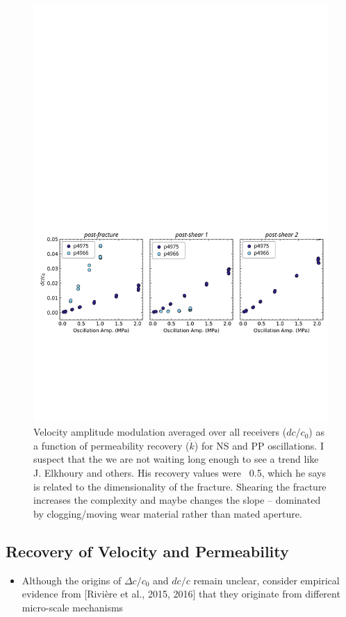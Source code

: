\documentclass[letterpaper,10pt]{article}
\begin{document}
\begin{figure}[ht]
	\includegraphics[width=1\columnwidth]{Dc_PP_amp}
	\caption{Velocity amplitude modulation averaged over all receivers ($ dc/c_0 $) as a function of permeability recovery ($ \dot k $) for NS and PP oscillations. 
		I suspect that the we are not waiting long enough to see a trend like J. Elkhoury and others. His recovery values were ~0.5, which he says is related to the dimensionality of the fracture. Shearing the fracture increases the complexity and maybe changes the slope -- dominated by clogging/moving wear material rather than mated aperture.}
	\label{fig:dc_plots2}
\end{figure}

\newpage

\subsection{Recovery of Velocity and Permeability}
\begin{itemize}
	\item Although the origins of $ \Delta c/c_0 $ and $ dc/c $ remain unclear, consider empirical evidence from [Rivière et al., 2015, 2016] that they originate from different micro-scale mechanisms 
\end{itemize}
\end{document}
